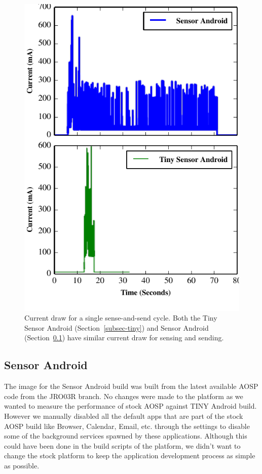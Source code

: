 \begin{figure}[t]
\includegraphics[width=\columnwidth]{./figures/traces.pdf}

\caption{\small Current draw for a single sense-and-send cycle.
\textnormal{Both the Tiny Sensor Android (Section~\ref{subsec-tiny}) and
            Sensor Android (Section~\ref{subsec-full}) have similar current draw for sensing and sending.}}

\label{fig-tinyandroid}
\end{figure}


\subsection{Sensor Android}
\label{subsec-full}

The image for the Sensor Android build was built from the latest available AOSP code 
from the JRO03R branch. No changes were made to the platform as we wanted to measure 
the performance of stock AOSP against TINY Android build.
However we manually disabled all the default apps that are part of the stock AOSP build like Browser, 
Calendar, Email, etc. through the settings to disable some of the background services spawned by these applications. 
Although this could have been done in the build scripts of the platform, 
we didn't want to change the stock platform to keep the application development process as simple as possible.

